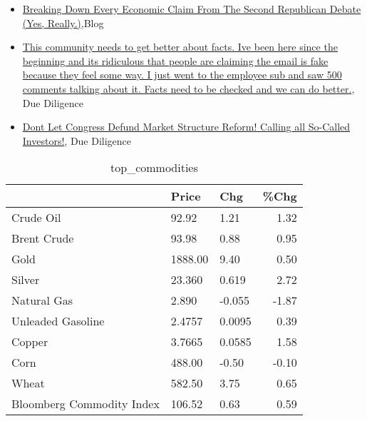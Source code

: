 \documentclass{article}%
\begin{document}
\begin{itemize}
\item%
\href{https://reddit.com/r/Economics/comments/16uuein/breaking\_down\_every\_economic\_claim\_from\_the/}{Breaking Down Every Economic Claim From The Second Republican Debate (Yes, Really.)},Blog%
\item%
\href{https://reddit.com/r/Superstonk/comments/16vandw/this\_community\_needs\_to\_get\_better\_about\_facts/}{This community needs to get better about facts. Ive been here since the beginning and its ridiculous that people are claiming the email is fake because they feel some way. I just went to the employee sub and saw 500 comments talking about it. Facts need to be checked and we can do better.}, Due Diligence%
\item%
\href{https://reddit.com/r/Superstonk/comments/16vadrb/dont\_let\_congress\_defund\_market\_structure\_reform/}{Dont Let Congress Defund Market Structure Reform! Calling all So-Called Investors!}, Due Diligence%
\end{itemize}%


\begin{table}[htbp]%
\caption{top\_commodities}%
\centering%
\begin{adjustbox}{width=1\textwidth}%
\begin{tabular}{lllr}
\toprule
                          &   Price &    Chg &  \%Chg \\
\midrule
               Crude Oil  &   92.92 &   1.21 &  1.32 \\
             Brent Crude  &   93.98 &   0.88 &  0.95 \\
                    Gold  & 1888.00 &   9.40 &  0.50 \\
                  Silver  &  23.360 &  0.619 &  2.72 \\
             Natural Gas  &   2.890 & -0.055 & -1.87 \\
       Unleaded Gasoline  &  2.4757 & 0.0095 &  0.39 \\
                  Copper  &  3.7665 & 0.0585 &  1.58 \\
                    Corn  &  488.00 &  -0.50 & -0.10 \\
                   Wheat  &  582.50 &   3.75 &  0.65 \\
Bloomberg Commodity Index &  106.52 &   0.63 &  0.59 \\
\bottomrule
\end{tabular}
%
\end{adjustbox}%
\end{table}

%
\end{document}
